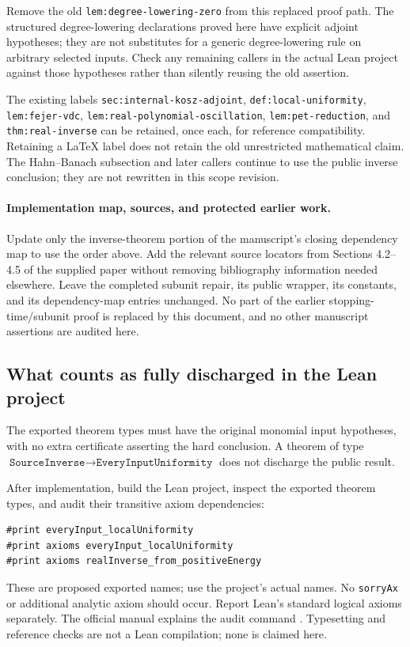 \documentclass[11pt]{article}
\theoremstyle{definition}
\newcommand{\pid}[1]{\nolinkurl{#1}}
\begin{document}
Remove the old \pid{lem:degree-lowering-zero} from this replaced proof path.
The structured degree-lowering declarations proved here have explicit adjoint hypotheses;
they are not substitutes for a generic degree-lowering rule on arbitrary selected inputs.
Check any remaining callers in the actual Lean project against those hypotheses rather
than silently reusing the old assertion.

The existing labels \pid{sec:internal-kosz-adjoint}, \pid{def:local-uniformity},
\pid{lem:fejer-vdc}, \pid{lem:real-polynomial-oscillation}, \pid{lem:pet-reduction},
and \pid{thm:real-inverse} can be retained, once each, for reference compatibility.
Retaining a LaTeX label does not retain the old unrestricted mathematical claim.
The Hahn--Banach subsection and later callers continue to use the public inverse conclusion;
they are not rewritten in this scope revision.

\paragraph{Implementation map, sources, and protected earlier work.}
Update only the inverse-theorem portion of the manuscript's closing dependency map to use
the order above.  Add the relevant source locators from Sections 4.2--4.5 of the supplied
paper without removing bibliography information needed elsewhere.
Leave the completed subunit repair, its public wrapper, its constants, and its dependency-map
entries unchanged.  No part of the earlier stopping-time/subunit proof is replaced by this
document, and no other manuscript assertions are audited here.

\subsection{What counts as fully discharged in the Lean project}
The exported theorem types must have the original monomial input hypotheses, with no extra
certificate asserting the hard conclusion.  A theorem of type
$\texttt{SourceInverse}\to\texttt{EveryInputUniformity}$ does not discharge the public result.

After implementation, build the Lean project, inspect the exported theorem types, and audit
their transitive axiom dependencies:
\begin{verbatim}
#print everyInput_localUniformity
#print axioms everyInput_localUniformity
#print axioms realInverse_from_positiveEnergy
\end{verbatim}
These are proposed exported names; use the project's actual names.
No \pid{sorryAx} or additional analytic axiom should occur.  Report Lean's standard logical
axioms separately.  The official manual explains the audit command \cite{LeanValidation}.
Typesetting and reference checks are not a Lean compilation; none is claimed here.
\end{document}
